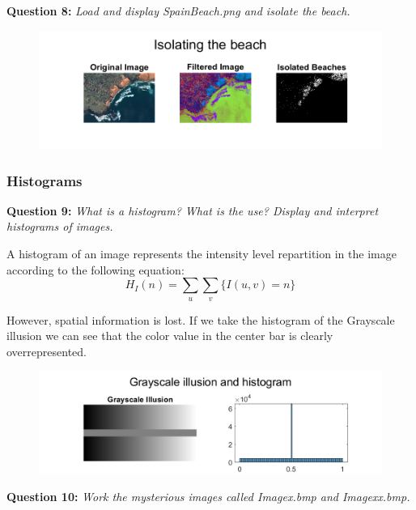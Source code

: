 \textbf{Question 8:}
\textit{Load and display SpainBeach.png and isolate the beach.}


\begin{figure}[H]
    \centering
    \includegraphics[width=\linewidth]{Doc/Graphics/Part1/Part1_Question8.png}
    \label{fig:enter-label}
\end{figure}



\subsubsection{Histograms}
\textbf{Question 9:}
\textit{What is a histogram? What is the use? Display and interpret histograms of images.}

A histogram of an image represents the intensity level repartition in the image according to the following equation:
\[H_I(n) = \sum_{u} \sum_{v} \{ I(u, v) = n \}\]

However, spatial information is lost. 
If we take the histogram of the Grayscale illusion we can see that the color value in the center bar is clearly overrepresented.

\begin{figure}[h]
    \centering
    \includegraphics[width=0.75\linewidth]{Doc/Graphics/Part1/part1_Q9.png}
\end{figure}


\textbf{Question 10:}
\textit{Work the mysterious images called Imagex.bmp and Imagexx.bmp.}






